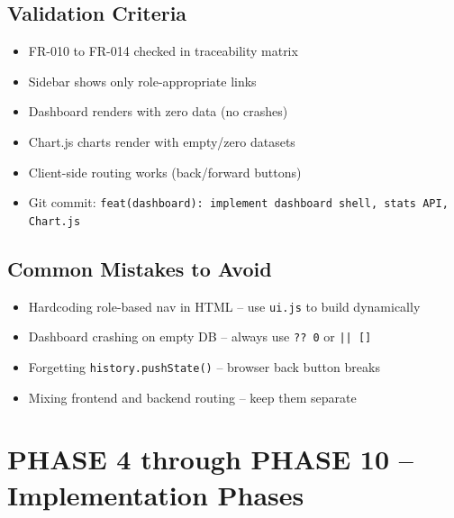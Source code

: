 \documentclass[11pt,a4paper]{report}
\newcommand{\todo}{\textcolor{helixamber}{\textbf{[ ]}}}
\newcommand{\filepath}[1]{\texttt{\small#1}}
\begin{document}
\section*{Validation Criteria}

\begin{itemize}
    \item[\todo] FR-010 to FR-014 checked in traceability matrix
    \item[\todo] Sidebar shows only role-appropriate links
    \item[\todo] Dashboard renders with zero data (no crashes)
    \item[\todo] Chart.js charts render with empty/zero datasets
    \item[\todo] Client-side routing works (back/forward buttons)
    \item[\todo] Git commit: \texttt{feat(dashboard): implement dashboard shell, stats API, Chart.js}
\end{itemize}

\section*{Common Mistakes to Avoid}

\begin{warnbox}[title=Watch Out]
\begin{itemize}
    \item[$\times$] Hardcoding role-based nav in HTML -- use \filepath{ui.js} to build dynamically
    \item[$\times$] Dashboard crashing on empty DB -- always use \texttt{?? 0} or \texttt{|| []}
    \item[$\times$] Forgetting \texttt{history.pushState()} -- browser back button breaks
    \item[$\times$] Mixing frontend and backend routing -- keep them separate
\end{itemize}
\end{warnbox}

\chapter{PHASE 4 through PHASE 10 -- Implementation Phases}
\end{document}
